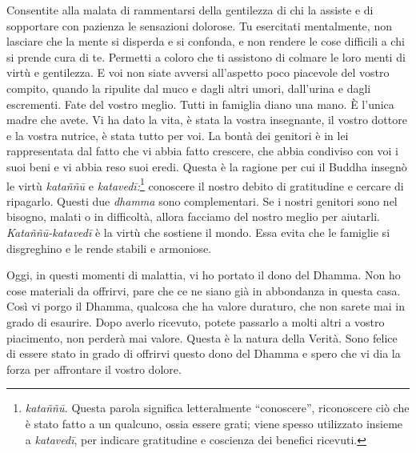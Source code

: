 Consentite alla malata di rammentarsi della gentilezza di chi la assiste
e di sopportare con pazienza le sensazioni dolorose. Tu esercitati
mentalmente, non lasciare che la mente si disperda e si confonda, e non
rendere le cose difficili a chi si prende cura di te. Permetti a coloro
che ti assistono di colmare le loro menti di virtù e gentilezza. E voi
non siate avversi all'aspetto poco piacevole del vostro compito, quando
la ripulite dal muco e dagli altri umori, dall'urina e dagli escrementi.
Fate del vostro meglio. Tutti in famiglia diano una mano. È l'unica
madre che avete. Vi ha dato la vita, è stata la vostra insegnante, il
vostro dottore e la vostra nutrice, è stata tutto per voi. La bontà dei
genitori è in lei rappresentata dal fatto che vi abbia fatto crescere,
che abbia condiviso con voi i suoi beni e vi abbia reso suoi eredi.
Questa è la ragione per cui il Buddha insegnò le virtù \emph{kataññū} e
\emph{katavedī:}\footnote{\emph{kataññū.} Questa parola significa
  letteralmente ``conoscere'', riconoscere ciò che è stato fatto a un
  qualcuno, ossia essere grati; viene spesso utilizzato insieme a
  \emph{katavedī}, per indicare gratitudine e coscienza dei benefici
  ricevuti.} conoscere il nostro debito di gratitudine e cercare di
ripagarlo. Questi due \emph{dhamma} sono complementari. Se i nostri
genitori sono nel bisogno, malati o in difficoltà, allora facciamo del
nostro meglio per aiutarli. \emph{Kataññū-katavedī} è la virtù che
sostiene il mondo. Essa evita che le famiglie si disgreghino e le rende
stabili e armoniose.

Oggi, in questi momenti di malattia, vi ho portato il dono del Dhamma.
Non ho cose materiali da offrirvi, pare che ce ne siano già in
abbondanza in questa casa. Così vi porgo il Dhamma, qualcosa che ha
valore duraturo, che non sarete mai in grado di esaurire. Dopo averlo
ricevuto, potete passarlo a molti altri a vostro piacimento, non perderà
mai valore. Questa è la natura della Verità. Sono felice di essere stato
in grado di offrirvi questo dono del Dhamma e spero che vi dia la forza
per affrontare il vostro dolore.

